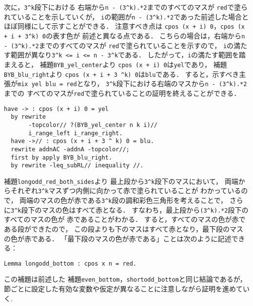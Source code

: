 次に，{\tt{3\verb|^|k}}段下における
右端から{\tt{n - (3\verb|^|k).*2}}までのすべてのマスが
{\tt{red}}で塗られていることを示していくが，
{\tt{i}}の範囲が{\tt{n - (3\verb|^|k).*2}}であった前述した場合と
ほぼ同様にして示すことができる．
注意すべき点は
{\tt{cpos (x + i) 0}}，{\tt{cpos (x + i + 3\verb|^|k) 0}}の表す色が
前述と異なる点である．
こちらの場合は，右端から{\tt{n - (3\verb|^|k).*2}}までのすべてのマスが
{\tt{red}}で塗られていることを示すので，
{\tt{i}}の満たす範囲が異なり{\tt{3\verb|^|k <= i <= n - 3\verb|^|k}}である．
したがって，{\tt{i}}の満たす範囲を踏まえると，
補題{\tt{BYB\_yel\_center}}より
{\tt{cpos (x + i) 0}}は{\tt{yel}}であり，
補題{\tt{BYB\_blu\_right}}より
{\tt{cpos (x + i + 3 \verb|^|k) 0}}は{\tt{blu}}である．
すると，示すべき主張が{\tt{mix yel blu = red}}となり，
{\tt{3\verb|^|k}}段下における右端のマスから{\tt{n - (3\verb|^|k).*2}}までの
すべてのマスが{\tt{red}}で塗られていることの証明を終えることができる．
\begin{lstlisting}[language=Coq]
  have -> : cpos (x + i) 0 = yel
  by rewrite
       -topcolor// ?(BYB_yel_center n k i)//
       i_range_left i_range_right.
  have ->// : cpos (x + i + 3 ^ k) 0 = blu.
  rewrite addnAC -addnA -topcolor//;
  first by apply BYB_blu_right.
  by rewrite -leq_subRL// inequality //.
\end{lstlisting}

補題{\tt{longodd\_red\_both\_sides}}より
最上段から{\tt{3\verb|^|k}}段下のマスにおいて，
両端からそれぞれ{\tt{3\verb|^|k}}マスずつ内側に向かって赤で塗られていることが
わかっているので，
両端のマスの色が赤である{\tt{3\verb|^|k}}段の調和彩色三角形を考えることで，
さらに{\tt{3\verb|^|k}}段下のマスの色はすべて赤となる．
すなわち，最上段から{\tt{(3\verb|^|k).*2}}段下のすべてのマスの色が
赤であることがわかる．
すると，すべてのマスの色が赤である段ができたので，
この段よりも下のマスはすべて赤となり，最下段のマスの色が赤である．
「最下段のマスの色が赤である」ことは次のように記述できる：
\begin{lstlisting}[language=Coq]
  Lemma longodd_bottom : cpos x n = red.
\end{lstlisting}
この補題は前述した
補題{\tt{even\_bottom}}，{\tt{shortodd\_bottom}}と同じ結論であるが，
節ごとに設定した有効な変数や仮定が異なることに注意しながら証明を進めていく.

